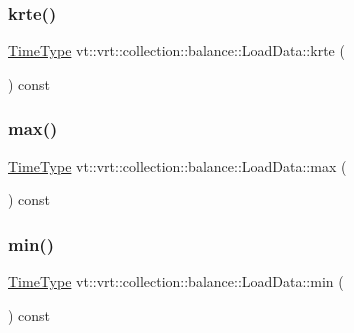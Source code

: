 \subsubsection{\texorpdfstring{krte()}{krte()}}
{\footnotesize\ttfamily \hyperlink{namespacevt_a876a9d0cd5a952859c72de8a46881442}{Time\+Type} vt\+::vrt\+::collection\+::balance\+::\+Load\+Data\+::krte (\begin{DoxyParamCaption}{ }\end{DoxyParamCaption}) const\hspace{0.3cm}{\ttfamily [inline]}}

\mbox{\label{structvt_1_1vrt_1_1collection_1_1balance_1_1_load_data_a5b1b307477ac122e6df08f28ecf6bb71}} 
\subsubsection{\texorpdfstring{max()}{max()}}
{\footnotesize\ttfamily \hyperlink{namespacevt_a876a9d0cd5a952859c72de8a46881442}{Time\+Type} vt\+::vrt\+::collection\+::balance\+::\+Load\+Data\+::max (\begin{DoxyParamCaption}{ }\end{DoxyParamCaption}) const\hspace{0.3cm}{\ttfamily [inline]}}

\mbox{\label{structvt_1_1vrt_1_1collection_1_1balance_1_1_load_data_a3a4fc0cb3206cb552e83ef1caa8975eb}} 
\subsubsection{\texorpdfstring{min()}{min()}}
{\footnotesize\ttfamily \hyperlink{namespacevt_a876a9d0cd5a952859c72de8a46881442}{Time\+Type} vt\+::vrt\+::collection\+::balance\+::\+Load\+Data\+::min (\begin{DoxyParamCaption}{ }\end{DoxyParamCaption}) const\hspace{0.3cm}{\ttfamily [inline]}}

